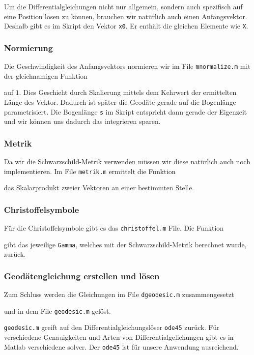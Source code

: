 \begin{refsection}
    Um die Differentialgleichungen nicht nur allgemein, sondern auch spezifisch auf eine Position lösen zu können, brauchen wir natürlich auch einen Anfangsvektor. Deshalb gibt es im Skript den Vektor \texttt{x0}. Er enthält die gleichen Elemente wie \texttt{X}.
    
    \subsubsection{Normierung}
    Die Geschwindigkeit des Anfangsvektors normieren wir im File \texttt{mnormalize.m} mit der gleichnamigen Funktion 
     
    auf $1$. Dies Geschieht durch Skalierung mittels dem Kehrwert der ermittelten Länge des Vektor. Dadurch ist später die Geodäte gerade auf die Bogenlänge parametrisiert. Die Bogenlänge \texttt{s} im Skript entspricht dann gerade der Eigenzeit und wir können uns dadurch das integrieren sparen.
    
    \subsubsection{Metrik}
    Da wir die Schwarzschild-Metrik verwenden müssen wir diese natürlich auch noch implementieren.
    Im File \texttt{metrik.m} ermittelt die Funktion
     
    das Skalarprodukt zweier Vektoren an einer bestimmten Stelle.
    \subsubsection{Christoffelsymbole}
    Für die Christoffelsymbole gibt es das \texttt{christoffel.m} File. Die Funktion 
     
    gibt das jeweilige \texttt{Gamma}, welches mit der Schwarzschild-Metrik berechnet wurde, zurück.
    \subsubsection{Geodätengleichung erstellen und lösen}
    Zum Schluss werden die Gleichungen im File \texttt{dgeodesic.m} zusammengesetzt
     
    und in dem File \texttt{geodesic.m} gelöst. 
     
    \texttt{geodesic.m} greift auf den Differentialgleichungslöser \texttt{ode45} zurück. Für verschiedene Genauigkeiten und Arten von Differentialgelichungen gibt es in Matlab verschiedene solver. Der \texttt{ode45} ist für unsere Anwendung ausreichend.
    

\end{refsection}
